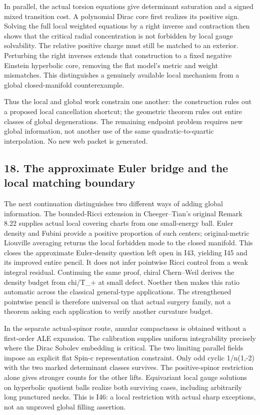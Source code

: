 \documentclass[
  10pt,
]{article}
\begin{document}
In parallel, the actual torsion equations give determinant saturation
and a signed mixed transition cost. A polynomial Dirac core first
realizes its positive sign. Solving the full local weighted equations by
a right inverse and contraction then shows that the critical radial
concentration is not forbidden by local gauge solvability. The relative
positive charge must still be matched to an exterior. Perturbing the
right inverses extends that construction to a fixed negative Einstein
hyperbolic core, removing the flat model's metric and weight mismatches.
This distinguishes a genuinely available local mechanism from a global
closed-manifold counterexample.

Thus the local and global work constrain one another: the construction
rules out a proposed local cancellation shortcut; the geometric theorem
rules out entire classes of global degenerations. The remaining endpoint
problem requires new global information, not another use of the same
quadratic-to-quartic interpolation. No new web packet is generated.

\hypertarget{the-approximate-euler-bridge-and-the-local-matching-boundary}{%
\subsection{18. The approximate Euler bridge and the local matching
boundary}\label{the-approximate-euler-bridge-and-the-local-matching-boundary}}

The next continuation distinguishes two different ways of adding global
information. The bounded-Ricci extension in Cheeger--Tian's original
Remark 8.22 supplies actual local covering charts from one small-energy
ball. Euler density and Fubini provide a positive proportion of such
centers; original-metric Liouville averaging returns the local forbidden
mode to the closed manifold. This closes the approximate Euler-density
question left open in I43, yielding I45 and its improved entire pencil.
It does not infer pointwise Ricci control from a weak integral residual.
Continuing the same proof, chiral Chern--Weil derives the density budget
from chi/T\_+ at small defect. Noether then makes this ratio automatic
across the classical general-type applications. The strengthened
pointwise pencil is therefore universal on that actual surgery family,
not a theorem asking each application to verify another curvature
budget.

In the separate actual-spinor route, annular compactness is obtained
without a first-order ALE expansion. The calibration supplies uniform
integrability precisely where the Dirac Sobolev embedding is critical.
The two limiting parallel fields impose an explicit flat Spin-c
representation constraint. Only odd cyclic 1/n(1,-2) with the two marked
determinant classes survives. The positive-spinor restriction alone
gives stronger counts for the other lifts. Equivariant local gauge
solutions on hyperbolic quotient balls realize both surviving cases,
including arbitrarily long punctured necks. This is I46: a local
restriction with actual sharp exceptions, not an unproved global filling
assertion.
\end{document}
